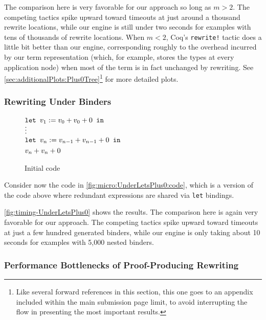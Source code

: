 The comparison here is very favorable for our approach so long as $m > 2$.
The competing tactics spike upward toward timeouts at just around a thousand rewrite locations, while our engine is still under two seconds for examples with tens of thousands of rewrite locations.
When $m < 2$, Coq's \texttt{rewrite!} tactic does a little bit better than our engine, corresponding roughly to the overhead incurred by our term representation (which, for example, stores the types at every application node) when most of the term is in fact unchanged by rewriting.
See \autoref{sec:additionalPlots:Plus0Tree}\footnote{Like several forward references in this section, this one goes to an appendix included within the main submission page limit, to avoid interrupting the flow in presenting the most important results.} for more detailed plots.

\subsubsection{Rewriting Under Binders} \label{sec:micro:UnderLetsPlus0}

\begin{figure}
{\small $\begin{aligned}
  & \letin[{v_1 := v_0 + v_0 + 0}{}] \\ \noalign{\vskip-7pt}
  & \vdots \\ \noalign{\vskip-3pt}
  & \letin[{v_n := v_{n-1} + v_{n-1} + 0}{}] \\
  & v_n + v_n + 0
\end{aligned}$}%
\caption{\label{fig:micro:UnderLetsPlus0:code}Initial code}
\end{figure}

Consider now the code in \autoref{fig:micro:UnderLetsPlus0:code}, which is a version of the code above where redundant expressions are shared via \texttt{let} bindings.

\autoref{fig:timing-UnderLetsPlus0} shows the results.
The comparison here is again very favorable for our approach.
The competing tactics spike upward toward timeouts at just a few hundred generated binders, while our engine is only taking about 10 seconds for examples with 5,000 nested binders.

\subsubsection{Performance Bottlenecks of Proof-Producing Rewriting} \label{sec:micro:setoid-rewrite-bottlenecks-lite}

